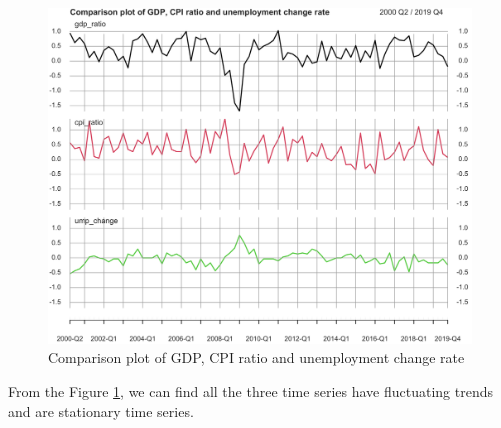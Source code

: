 \documentclass{report}
\begin{document}
\begin{figure}[H] 
\centering
\includegraphics[width=1\textwidth]{ratio_plot} 
\caption{Comparison plot of GDP, CPI ratio and unemployment change rate} 
\label{Fig.main2}
\end{figure}

From the Figure \ref{Fig.main2}, we can find all the  three time series have fluctuating trends and are stationary time series.
\end{document}
